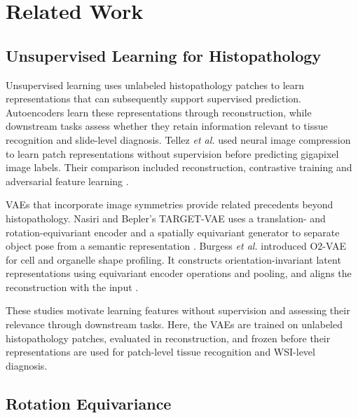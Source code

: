 \documentclass[conference,a4paper]{IEEEtran}
\begin{document}
\section{Related Work}

\subsection{Unsupervised Learning for Histopathology}
Unsupervised learning uses unlabeled histopathology patches to learn
representations that can subsequently support supervised prediction.
Autoencoders learn these representations through reconstruction, while
downstream tasks assess whether they retain information relevant to tissue
recognition and slide-level diagnosis. Tellez \emph{et al.} used neural image
compression to learn patch representations without supervision before
predicting gigapixel image labels. Their comparison included reconstruction,
contrastive training and adversarial feature learning
\cite{tellez_neural_2021}.

VAEs that incorporate image symmetries provide related precedents beyond
histopathology. Nasiri and Bepler's TARGET-VAE uses a translation- and
rotation-equivariant encoder and a spatially equivariant generator to separate
object pose from a semantic representation \cite{nasiri_target_2022}.
Burgess \emph{et al.} introduced O2-VAE for cell and organelle shape profiling.
It constructs orientation-invariant latent representations using equivariant
encoder operations and pooling, and aligns the reconstruction with the input
\cite{burgess_orientation_2024}.

These studies motivate learning features without supervision and assessing
their relevance through downstream tasks. Here, the VAEs are trained on
unlabeled histopathology patches, evaluated in reconstruction, and frozen
before their representations are used for patch-level tissue recognition and
WSI-level diagnosis.

\subsection{Rotation Equivariance}
\end{document}
